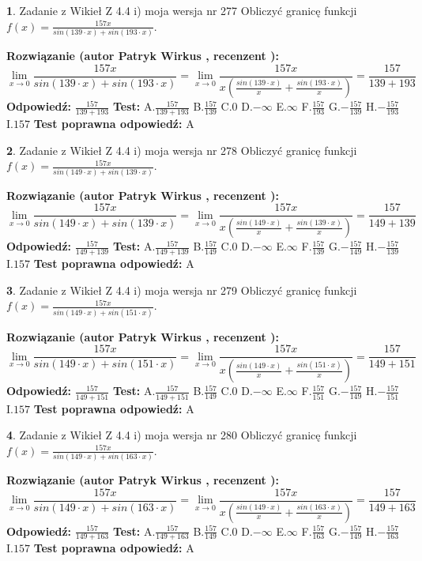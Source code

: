 \documentclass[12pt, a4paper]{article}
\theoremstyle{definition} %
\newtheorem{zad}{}
\newcommand{\zadStart}[1]{\begin{zad}#1\newline}
\newcommand{\zadStop}{\end{zad}}
\newcommand{\rozwStart}[2]{\noindent \textbf{Rozwiązanie (autor #1 , recenzent #2): }\newline}
\newcommand{\rozwStop}{\newline}
\newcommand{\odpStart}{\noindent \textbf{Odpowiedź:}\newline}
\newcommand{\odpStop}{\newline}
\newcommand{\testStart}{\noindent \textbf{Test:}\newline}
\newcommand{\testStop}{\newline}
\newcommand{\kluczStart}{\noindent \textbf{Test poprawna odpowiedź:}\newline}
\newcommand{\kluczStop}{\newline}
\begin{document}
\zadStart{Zadanie z Wikieł Z 4.4 i) moja wersja nr 277}
Obliczyć granicę funkcji $f(x)=\frac{157x}{sin(139\cdot x) +sin(193\cdot x)}$.
\zadStop
\rozwStart{Patryk Wirkus}{}
$$\lim\limits_{x\to 0}\frac{157x}{sin(139\cdot x) +sin(193\cdot x)}=\lim\limits_{x\to 0}\frac{157x}{x(\frac{sin(139\cdot x)}{x}+\frac{sin(193\cdot x)}{x})}=\frac{157}{139+193}$$
\rozwStop
\odpStart
$\frac{157}{139+193}$
\odpStop
\testStart
A.$\frac{157}{139+193}$
B.$\frac{157}{139}$
C.$0$
D.$-\infty$
E.$\infty$
F.$\frac{157}{193}$
G.$-\frac{157}{139}$
H.$-\frac{157}{193}$
I.$157$
\testStop
\kluczStart
A
\kluczStop



\zadStart{Zadanie z Wikieł Z 4.4 i) moja wersja nr 278}
Obliczyć granicę funkcji $f(x)=\frac{157x}{sin(149\cdot x) +sin(139\cdot x)}$.
\zadStop
\rozwStart{Patryk Wirkus}{}
$$\lim\limits_{x\to 0}\frac{157x}{sin(149\cdot x) +sin(139\cdot x)}=\lim\limits_{x\to 0}\frac{157x}{x(\frac{sin(149\cdot x)}{x}+\frac{sin(139\cdot x)}{x})}=\frac{157}{149+139}$$
\rozwStop
\odpStart
$\frac{157}{149+139}$
\odpStop
\testStart
A.$\frac{157}{149+139}$
B.$\frac{157}{149}$
C.$0$
D.$-\infty$
E.$\infty$
F.$\frac{157}{139}$
G.$-\frac{157}{149}$
H.$-\frac{157}{139}$
I.$157$
\testStop
\kluczStart
A
\kluczStop



\zadStart{Zadanie z Wikieł Z 4.4 i) moja wersja nr 279}
Obliczyć granicę funkcji $f(x)=\frac{157x}{sin(149\cdot x) +sin(151\cdot x)}$.
\zadStop
\rozwStart{Patryk Wirkus}{}
$$\lim\limits_{x\to 0}\frac{157x}{sin(149\cdot x) +sin(151\cdot x)}=\lim\limits_{x\to 0}\frac{157x}{x(\frac{sin(149\cdot x)}{x}+\frac{sin(151\cdot x)}{x})}=\frac{157}{149+151}$$
\rozwStop
\odpStart
$\frac{157}{149+151}$
\odpStop
\testStart
A.$\frac{157}{149+151}$
B.$\frac{157}{149}$
C.$0$
D.$-\infty$
E.$\infty$
F.$\frac{157}{151}$
G.$-\frac{157}{149}$
H.$-\frac{157}{151}$
I.$157$
\testStop
\kluczStart
A
\kluczStop



\zadStart{Zadanie z Wikieł Z 4.4 i) moja wersja nr 280}
Obliczyć granicę funkcji $f(x)=\frac{157x}{sin(149\cdot x) +sin(163\cdot x)}$.
\zadStop
\rozwStart{Patryk Wirkus}{}
$$\lim\limits_{x\to 0}\frac{157x}{sin(149\cdot x) +sin(163\cdot x)}=\lim\limits_{x\to 0}\frac{157x}{x(\frac{sin(149\cdot x)}{x}+\frac{sin(163\cdot x)}{x})}=\frac{157}{149+163}$$
\rozwStop
\odpStart
$\frac{157}{149+163}$
\odpStop
\testStart
A.$\frac{157}{149+163}$
B.$\frac{157}{149}$
C.$0$
D.$-\infty$
E.$\infty$
F.$\frac{157}{163}$
G.$-\frac{157}{149}$
H.$-\frac{157}{163}$
I.$157$
\testStop
\kluczStart
A
\kluczStop
\end{document}
